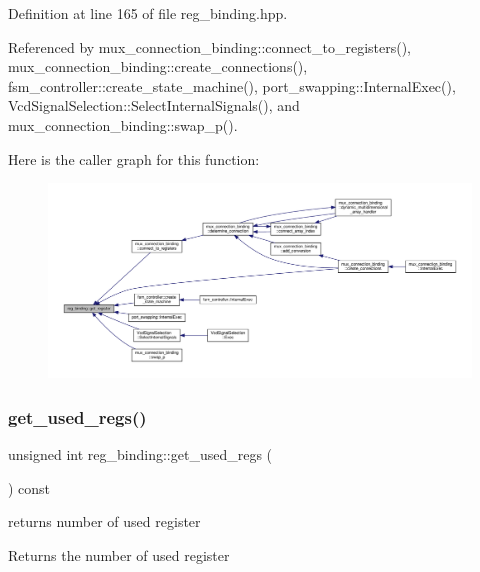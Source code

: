 Definition at line 165 of file reg\+\_\+binding.\+hpp.



Referenced by mux\+\_\+connection\+\_\+binding\+::connect\+\_\+to\+\_\+registers(), mux\+\_\+connection\+\_\+binding\+::create\+\_\+connections(), fsm\+\_\+controller\+::create\+\_\+state\+\_\+machine(), port\+\_\+swapping\+::\+Internal\+Exec(), Vcd\+Signal\+Selection\+::\+Select\+Internal\+Signals(), and mux\+\_\+connection\+\_\+binding\+::swap\+\_\+p().

Here is the caller graph for this function\+:
\nopagebreak
\begin{figure}[H]
\begin{center}
\leavevmode
\includegraphics[width=350pt]{da/d7c/classreg__binding_a3bcf2f1b1510f1c719a8e38667551f60_icgraph}
\end{center}
\end{figure}
\mbox{\label{classreg__binding_abd5a377a89a2590ab41f32bf54d5f8ae}} 
\subsubsection{\texorpdfstring{get\+\_\+used\+\_\+regs()}{get\_used\_regs()}}
{\footnotesize\ttfamily unsigned int reg\+\_\+binding\+::get\+\_\+used\+\_\+regs (\begin{DoxyParamCaption}{ }\end{DoxyParamCaption}) const\hspace{0.3cm}{\ttfamily [inline]}}



returns number of used register 

\begin{DoxyReturn}{Returns}
the number of used register 
\end{DoxyReturn}



